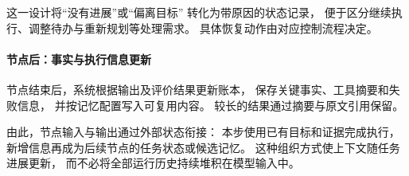 这一设计将“没有进展”或“偏离目标”
转化为带原因的状态记录，
便于区分继续执行、调整待办与重新规划等处理需求。
具体恢复动作由对应控制流程决定。




\paragraph{节点后：事实与执行信息更新}




节点结束后，系统根据输出及评价结果更新账本，
保存关键事实、工具摘要和失败信息，
并按记忆配置写入可复用内容。
较长的结果通过摘要与原文引用保留。

由此，节点输入与输出通过外部状态衔接：
本步使用已有目标和证据完成执行，
新增信息再成为后续节点的任务状态或候选记忆。
这种组织方式使上下文随任务进展更新，
而不必将全部运行历史持续堆积在模型输入中。

